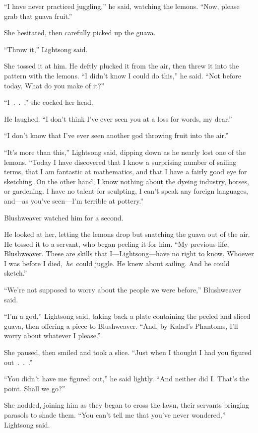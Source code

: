 “I have never practiced juggling,” he said, watching the lemons. “Now, please grab that guava fruit.”

She hesitated, then carefully picked up the guava.

“Throw it,” Lightsong said.

She tossed it at him. He deftly plucked it from the air, then threw it into the pattern with the lemons. “I didn’t know I could do this,” he said. “Not before today. What do you make of it?”

“I~.~.~.” she cocked her head.

He laughed. “I don’t think I’ve ever seen you at a loss for words, my dear.”

“I don’t know that I’ve ever seen another god throwing fruit into the air.”

“It’s more than this,” Lightsong said, dipping down as he nearly lost one of the lemons. “Today I have discovered that I know a surprising number of sailing terms, that I am fantastic at mathematics, and that I have a fairly good eye for sketching. On the other hand, I know nothing about the dyeing industry, horses, or gardening. I have no talent for sculpting, I can’t speak any foreign languages, and—as you’ve seen—I’m terrible at pottery.”

Blushweaver watched him for a second.

He looked at her, letting the lemons drop but snatching the guava out of the air. He tossed it to a servant, who began peeling it for him. “My previous life, Blushweaver. These are skills that I—Lightsong—have no right to know. Whoever I was before I died,~\textit{he}~could juggle. He knew about sailing. And he could sketch.”

“We’re not supposed to worry about the people we were before,” Blushweaver said.

“I’m a god,” Lightsong said, taking back a plate containing the peeled and sliced guava, then offering a piece to Blushweaver. “And, by Kalad’s Phantoms, I’ll worry about whatever I please.”

She paused, then smiled and took a slice. “Just when I thought I had you figured out~.~.~.”

“You didn’t have me figured out,” he said lightly. “And neither did I. That’s the point. Shall we go?”

She nodded, joining him as they began to cross the lawn, their servants bringing parasols to shade them. “You can’t tell me that you’ve never wondered,” Lightsong said.

